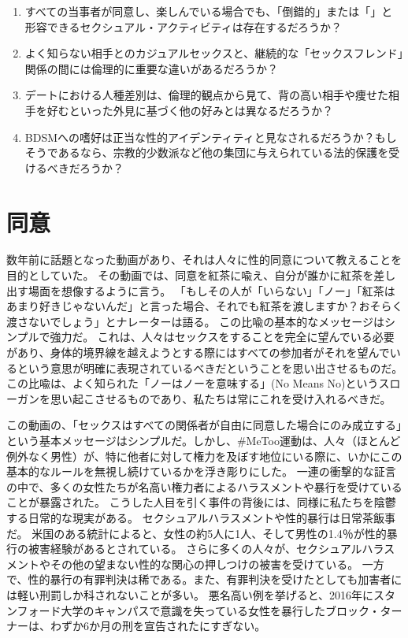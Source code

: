\documentclass[paper=a4,book,openany]{jlreq}
\begin{document}
\begin{enumerate}
    \item すべての当事者が同意し、楽しんでいる場合でも、「倒錯的」または「」と形容できるセクシュアル・アクティビティは存在するだろうか？
    \item よく知らない相手とのカジュアルセックスと、継続的な「セックスフレンド」関係の間には倫理的に重要な違いがあるだろうか？
    \item デートにおける人種差別は、倫理的観点から見て、背の高い相手や痩せた相手を好むといった外見に基づく他の好みとは異なるだろうか？
    \item BDSMへの嗜好は正当な性的アイデンティティと見なされるだろうか？もしそうであるなら、宗教的少数派など他の集団に与えられている法的保護を受けるべきだろうか？
\end{enumerate}

\chapter{同意}

数年前に話題となった動画があり、それは人々に性的同意について教えることを目的としていた。
その動画では、同意を紅茶に喩え、自分が誰かに紅茶を差し出す場面を想像するように言う。
「もしその人が「いらない」「ノー」「紅茶はあまり好きじゃないんだ」と言った場合、それでも紅茶を渡しますか？おそらく渡さないでしょう」とナレーターは語る。
この比喩の基本的なメッセージはシンプルで強力だ。
これは、人々はセックスをすることを完全に望んでいる必要があり、身体的境界線を越えようとする際にはすべての参加者がそれを望んでいるという意思が明確に表現されているべきだということを思い出させるものだ。
この比喩は、よく知られた「ノーはノーを意味する」(No Means No)というスローガンを思い起こさせるものであり、私たちは常にこれを受け入れるべきだ\citep{may15:_consen}。

この動画の、「セックスはすべての関係者が自由に同意した場合にのみ成立する」という基本メッセージはシンプルだ。しかし、\#MeToo運動は、人々（ほとんど例外なく男性）が、特に他者に対して権力を及ぼす地位にいる際に、いかにこの基本的なルールを無視し続けているかを浮き彫りにした。
一連の衝撃的な証言の中で、多くの女性たちが名高い権力者によるハラスメントや暴行を受けていることが暴露された。
こうした人目を引く事件の背後には、同様に私たちを陰鬱する日常的な現実がある。
セクシュアルハラスメントや性的暴行は日常茶飯事だ。
米国のある統計によると、女性の約5人に1人、そして男性の1.4％が性的暴行の被害経験があるとされている\citep{black11:_nation_intim_partn_sexual_violen_survey}。
さらに多くの人々が、セクシュアルハラスメントやその他の望まない性的な関心の押しつけの被害を受けている。
一方で、性的暴行の有罪判決は稀である。また、有罪判決を受けたとしても加害者には軽い刑罰しか科されないことが多い。
悪名高い例を挙げると、2016年にスタンフォード大学のキャンパスで意識を失っている女性を暴行したブロック・ターナーは、わずか6か月の刑を宣告されたにすぎない\citep{stack16:_light_senten_brock}。
\end{document}
